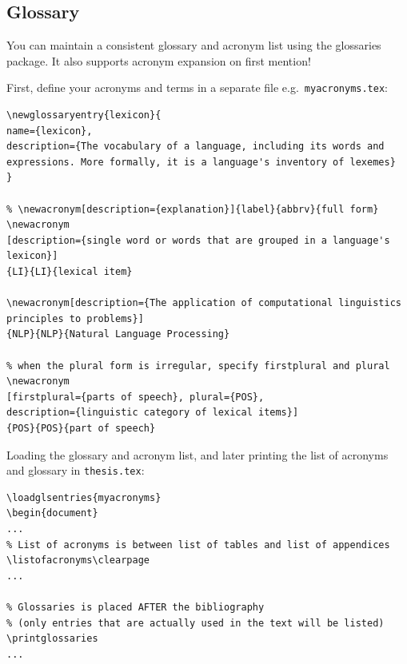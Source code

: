 \documentclass[a4paper,12pt]{scrartcl}
\begin{document}
\subsection{Glossary}\label{sec:glossary}
You can maintain a consistent glossary and acronym list using the \textsf{glossaries} package. It also supports acronym expansion on first mention! {\large\smiley}

First, define your acronyms and terms in a separate file e.g.~\texttt{myacronyms.tex}:

\medskip

\begin{lstlisting}[moretexcs={newacronym,newglossaryentry},basicstyle=\ttfamily\small,
emph={name,description,plural,firstplural},emphstyle=\bfseries]
% \newglossaryentry{label}{name={term},description={explanation}}
\newglossaryentry{lexicon}{
name={lexicon},
description={The vocabulary of a language, including its words and expressions. More formally, it is a language's inventory of lexemes}
}

% \newacronym[description={explanation}]{label}{abbrv}{full form}
\newacronym
[description={single word or words that are grouped in a language's lexicon}]
{LI}{LI}{lexical item}

\newacronym[description={The application of computational linguistics principles to problems}]
{NLP}{NLP}{Natural Language Processing}

% when the plural form is irregular, specify firstplural and plural
\newacronym
[firstplural={parts of speech}, plural={POS},
description={linguistic category of lexical items}]
{POS}{POS}{part of speech}
\end{lstlisting}

\bigskip

Loading the glossary and acronym list, and later printing the list of acronyms and glossary in \texttt{thesis.tex}:

\medskip

\begin{lstlisting}[moretexcs={loadglsentries,printglossaries,listofacronyms}]
% Must be loaded BEFORE \begin{document}!
\loadglsentries{myacronyms}
\begin{document}
...
% List of acronyms is between list of tables and list of appendices
\listofacronyms\clearpage
...

% Glossaries is placed AFTER the bibliography
% (only entries that are actually used in the text will be listed)
\printglossaries
...
\end{lstlisting}
\end{document}
